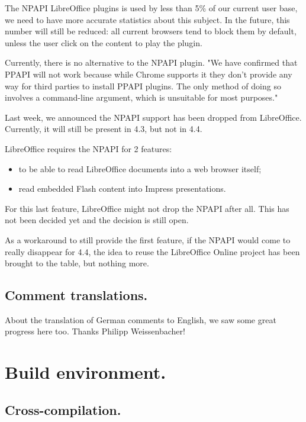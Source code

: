 \documentclass{article}
\begin{document}
The NPAPI LibreOffice plugins is used by less than 5\% of our current user base, we need to have more accurate statistics about this subject. In the future, this number will still be reduced: all current browsers tend to block them by default, unless the user click on the content to play the plugin.

Currently, there is no alternative to the NPAPI plugin. "We have confirmed that PPAPI will not work because while Chrome supports it they don't provide any way for third parties to install PPAPI plugins. The only method of doing so involves a command-line argument, which is unsuitable for most purposes\cite{ppapiNotSuitable}." 

Last week, we announced the NPAPI support has been dropped from LibreOffice. Currently, it will still be present in 4.3, but not in 4.4.

LibreOffice requires the NPAPI for 2 features:
\begin{itemize}
    \item to be able to read LibreOffice documents into a web browser itself;
    \item read embedded Flash content into Impress presentations.
\end{itemize}

For this last feature, LibreOffice might not drop the NPAPI after all. This has not been decided yet and the decision is still open.

As a workaround to still provide the first feature, if the NPAPI would come to really disappear for 4.4, the idea to reuse the LibreOffice Online project has been brought to the table, but nothing more.

\subsection{Comment translations.}

About the translation of German comments to English, we saw some great progress here too\cite{german1,german2}. Thanks Philipp Weissenbacher!



\section{Build environment.}

\subsection{Cross-compilation.}
\end{document}
